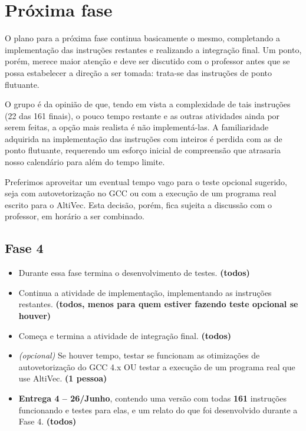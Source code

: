 \documentclass[twocolumn]{article}
\newcommand{\who}[1]{\textbf{ (#1)}}
\begin{document}
\section{Próxima fase}

O plano para a próxima fase continua basicamente o mesmo, completando a
implementação das instruções restantes e realizando a integração final. Um
ponto, porém, merece maior atenção e deve ser discutido com o professor antes
que se possa estabelecer a direção a ser tomada: trata-se das instruções de
ponto flutuante.

O grupo é da opinião de que, tendo em vista a complexidade de tais instruções
(22 das 161 finais), o pouco tempo restante e as outras atividades ainda por
serem feitas, a opção mais realista é não implementá-las.  A familiaridade
adquirida na implementação das instruções com inteiros é perdida com as de
ponto flutuante, requerendo um esforço inicial de compreensão que atrasaria
nosso calendário para além do tempo limite. 

Preferimos aproveitar um eventual tempo vago para o teste opcional sugerido,
seja com autovetorização no GCC ou com a execução de um programa real escrito
para o AltiVec. Esta decisão, porém, fica sujeita a discussão com o professor,
em horário a ser combinado.

\subsection{Fase 4}

\begin{itemize}

\item Durante essa fase termina o desenvolvimento de testes. \who{todos}

\item Continua a atividade de implementação, implementando as instruções
restantes. \who{todos, menos para quem estiver fazendo teste opcional se
houver}

\item Começa e termina a atividade de integração final. \who{todos}

\item \emph{(opcional)} Se houver tempo, testar se funcionam as otimizações de
autovetorização do GCC 4.x OU testar a execução de um programa real que use
AltiVec. \who{1 pessoa}

\item \textbf{Entrega 4 -- 26/Junho}, contendo uma versão com todas
\textbf{161} instruções funcionando e testes para elas, e um relato do que foi
desenvolvido durante a Fase 4. \who{todos}

\end{itemize}
\end{document}
